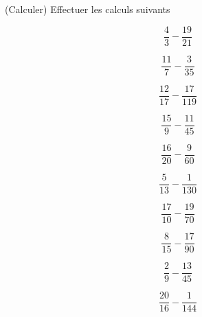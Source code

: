  (Calculer) Effectuer les calculs suivants

\begin{multicols}{5}
$$\dfrac{4}{3}-\dfrac{19}{21}$$

$$\dfrac{11}{7}-\dfrac{3}{35}$$

$$\dfrac{12}{17}-\dfrac{17}{119}$$

$$\dfrac{15}{9}-\dfrac{11}{45}$$

$$\dfrac{16}{20}-\dfrac{9}{60}$$

$$\dfrac{5}{13}-\dfrac{1}{130}$$

$$\dfrac{17}{10}-\dfrac{19}{70}$$

$$\dfrac{8}{15}-\dfrac{17}{90}$$

$$\dfrac{2}{9}-\dfrac{13}{45}$$

$$\dfrac{20}{16}-\dfrac{1}{144}$$

\end{multicols}